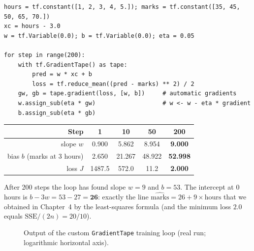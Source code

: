 \begin{lstlisting}
hours = tf.constant([1, 2, 3, 4, 5.]); marks = tf.constant([35, 45, 50, 65, 70.])
xc = hours - 3.0
w = tf.Variable(0.0); b = tf.Variable(0.0); eta = 0.05

for step in range(200):
    with tf.GradientTape() as tape:
        pred = w * xc + b
        loss = tf.reduce_mean((pred - marks) ** 2) / 2
    gw, gb = tape.gradient(loss, [w, b])     # automatic gradients
    w.assign_sub(eta * gw)                   # w <- w - eta * gradient
    b.assign_sub(eta * gb)
\end{lstlisting}

\begin{center}
\begin{tabular}{@{}rcccc@{}}
\toprule
\textbf{Step} & 1 & 10 & 50 & 200\\
\midrule
slope $w$ & 0.900 & 5.862 & 8.954 & \textbf{9.000}\\
bias $b$ (marks at 3 hours) & 2.650 & 21.267 & 48.922 & \textbf{52.998}\\
loss $J$ & 1487.5 & 572.0 & 11.2 & \textbf{2.000}\\
\bottomrule
\end{tabular}
\end{center}

\noindent After 200 steps the loop has found slope $w=9$ and $b=53$. The intercept at $0$ hours is $b-3w=53-27=\mathbf{26}$: exactly the line $\widehat{\text{marks}}=26+9\times\text{hours}$ that we obtained in Chapter~4 by the least-squares formula (and the minimum loss $2.0$ equals $\text{SSE}/(2n)=20/10$).

\begin{figure}[!htbp]
\centering
{}
\caption{Output of the custom \texttt{GradientTape} training loop (real run; logarithmic horizontal axis).}\label{fig:tapeloop}
\end{figure}

